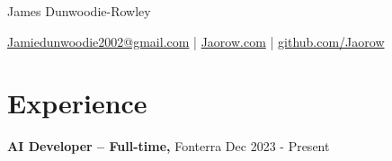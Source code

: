 \documentclass[11pt]{article}       %
\begin{document}
\centerline{\Huge James Dunwoodie-Rowley}

\vspace{5pt}


\centerline{\href{Jamiedunwoodie2002@gmail.com}{Jamiedunwoodie2002@gmail.com} | \href{Jaorow.com}{Jaorow.com} | \href{github.com/Jaorow}{github.com/Jaorow}}

\vspace{-10pt}


\section*{Experience}

\textbf{AI Developer -- Full-time,} {Fonterra} \hfill Dec 2023 - Present \\
\vspace{-9pt}
\end{document}
